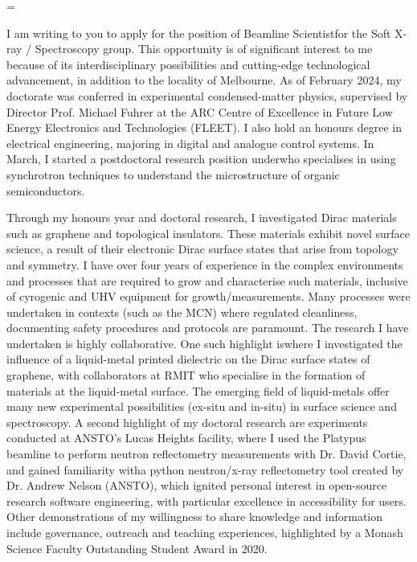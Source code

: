 \documentclass[10pt,a4paper,ragged2e,withhyper,paragraphstrue]{altacv}
\newcommand{\textalignment}{
	\justifying
    \tolerance=1 %
    \emergencystretch=\maxdimen
    \hyphenpenalty=10000 
    \hbadness=10000
}
\newcommand{\pind}{\hspace{24pt}}
\begin{document}
    {\color{emphasis}
    \textalignment
    \pind I am writing to you to apply for the position of Beamline Scientistfor the Soft X-ray / Spectroscopy group. This opportunity is of significant interest to me because of its interdisciplinary possibilities and cutting-edge technological advancement, in addition to the locality of Melbourne.
    As of February 2024, my doctorate was conferred in experimental condensed-matter physics, supervised by Director Prof. Michael Fuhrer at the ARC Centre of Excellence in Future Low Energy Electronics and Technologies (FLEET). I also hold an honours degree in electrical engineering, majoring in digital and analogue control systems.
    In March, I started a postdoctoral research position underwho specialises in using synchrotron techniques to understand the microstructure of organic semiconductors.
	
	\pind Through my honours year and doctoral research, I investigated Dirac materials such as graphene and topological insulators. These materials exhibit novel surface science, a result of their electronic Dirac surface states that arise from topology and symmetry. I have over four years of experience in the complex environments and processes that are required to grow and characterise such materials, inclusive of cyrogenic and UHV equipment for growth/measurements. Many processes were undertaken in contexts (such as the MCN) where regulated cleanliness, documenting safety procedures and protocols are paramount.
	The research I have undertaken is highly collaborative. One such highlight iswhere I investigated the influence of a liquid-metal printed dielectric on the Dirac surface states of graphene, with collaborators at RMIT who specialise in the formation of materials at the liquid-metal surface. The emerging field of liquid-metals offer many new experimental possibilities (ex-situ and in-situ) in surface science and spectroscopy. A second highlight of my doctoral research are experiments conducted at ANSTO's Lucas Heights facility, where I used the Platypus beamline to perform neutron reflectometry measurements with Dr. David Cortie, and gained familiarity witha python neutron/x-ray reflectometry tool created by Dr. Andrew Nelson (ANSTO), which ignited personal interest in open-source research software engineering, with particular excellence in accessibility for users.
	Other demonstrations of my willingness to share knowledge and information include governance, outreach and teaching experiences, highlighted by a Monash Science Faculty Outstanding Student Award in 2020.
	
}
\end{document}
